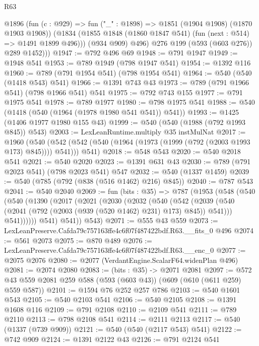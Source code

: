\begin{lexlean}{R63}
\begin{coremodule}
          @1896
            (fun (c : @929) => fun ("_" : @1898) => @1851 (@1904 @1908) (@1870 @1903 @1908))
            (@1834 (@1855 @1848 (@1860 @1847 @541) (fun (next : @514) => @1491 @1899 @496)))
            (@934 @909)
            @496)
          @276
          @199
          (@593 (@603 @276))
          @289
          @1452)))
@1947 := @792 @496 @69
@1948 := @791 @1947
@1949 := @1948 @541
@1953 := @789 @1949 (@798 @1947 @541)
@1954 := @1392 @116
@1960 := @789 (@791 @1954 @541) (@798 @1954 @541)
@1964 := @540 (@540 (@1418 @543) @541)
@1966 := @1391 @743 @43
@1973 := @789 (@791 @1966 @541) (@798 @1966 @541) @541
@1975 := @792 @743 @155
@1977 := @791 @1975 @541
@1978 := @789 @1977
@1980 := @798 @1975 @541
@1988 := @540 (@1418 (@540 (@1964 (@1978 @1980 @541 @541)) @541))
@1993 := @1425 (@1406 @1977 @1980 @155 @43)
@1999 := @540 (@540 (@1988 (@792 @1993 @845)) @543)
@2003 := LexLeanRuntime.multiply @35 instMulNat
@2017 := @1960
    (@540 (@542 (@542 (@540 (@1964 (@1973 (@1999 (@792 (@2003 @1993 @173) @845)))) @541))) @541)
@2018 := @548 @543
@2020 := @540 @2018 @541
@2021 := @540 @2020
@2023 := @1391 @631 @43
@2030 := @789 (@791 @2023 @541) (@798 @2023 @541) @547
@2032 := @540 (@1337 @1459)
@2039 := @540 (@785 (@792 (@838 (@516 @1462) @216) @845))
@2040 := @787 @543
@2041 := @540 @2040
@2069 := fun (bits : @35) =>
  @787
    (@1953
      (@548
        (@540
          (@540
            (@1390
              (@2017
                (@2021
                  (@2030
                    (@2032
                      (@540
                        (@542
                          (@2039
                            (@540 (@2041 (@792 (@2003 (@939 (@520 @1462) @231) @173) @845)) @541)))
                        @541))))))
            @541)
          @541))
      @543)
@2071 := @555 @43 @559
@2073 := LexLeanPreserve.Cafda79c757163ffe4c6f07f487422bdf.R63.__fits_0 @496
@2074 := @561 @2073
@2075 := @870 @489
@2076 := LexLeanPreserve.Cafda79c757163ffe4c6f07f487422bdf.R63.__enc_0
@2077 := @2075 @2076
@2080 := @2077 (VerdantEngine.ScalarF64.widenPlan @496)
@2081 := @2074 @2080
@2083 := (bits : @35) -> @2071 @2081
@2097 := @572 @43 @559 @2081 @259 @588 (@593 (@603 @43)) (@609 (@610 (@611 @259) @559 @587))
@2101 := @1594 @76 @252 @257 @786
@2103 := @540 @1601 @543
@2105 := @540 @2103 @541
@2106 := @540 @2105
@2108 := @1391 @1608 @116
@2109 := @791 @2108
@2110 := @2109 @541
@2111 := @789 @2110
@2113 := @798 @2108 @541
@2114 := @2111 @2113
@2117 := @540 (@1337 (@739 @909))
@2121 := @540 (@540 (@2117 @543) @541)
@2122 := @742 @909
@2124 := @1391 @2122 @43
@2126 := @791 @2124 @541

\end{coremodule}
\end{lexlean}
